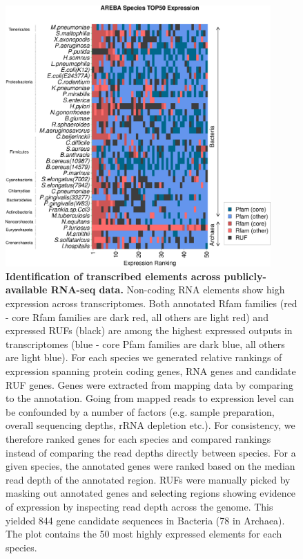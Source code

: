 \documentclass[10pt]{article}
\begin{document}
\begin{figure}[!ht]
\begin{center}
\includegraphics[width=4in]{figures/figure1.pdf}
\end{center}
\caption{ {\bf Identification of transcribed elements across
    publicly-available RNA-seq data.} Non-coding RNA elements show
  high expression across transcriptomes. Both annotated Rfam families
  (red - core Rfam families are dark red, all others are light red)
  and expressed RUFs (black) are among the highest expressed outputs
  in transcriptomes (blue - core Pfam families are dark blue, all
  others are light blue). For each species we generated relative
  rankings of expression spanning protein coding genes, RNA genes and
  candidate RUF genes. Genes were extracted from mapping data by
  comparing to the annotation. Going from mapped reads to expression
  level can be confounded by a number of factors (e.g. sample
  preparation, overall sequencing depths, rRNA depletion etc.). For
  consistency, we therefore ranked genes for each species and compared
  rankings instead of comparing the read depths directly between
  species. For a given species, the annotated genes were ranked based
  on the median read depth of the annotated region. RUFs were manually
  picked by masking out annotated genes and selecting regions showing
  evidence of expression by inspecting read depth across the
  genome. This yielded 844 gene candidate sequences in Bacteria (78 in
  Archaea). The plot contains the 50 most highly expressed elements
  for each species.}
\label{fig:1}
\end{figure}
\end{document}
